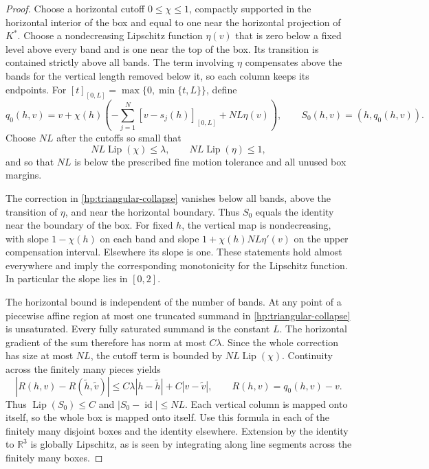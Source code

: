 \documentclass[11pt]{article}
\numberwithin{equation}{section}
\theoremstyle{definition}
\theoremstyle{remark}
\newcommand{\R}{\mathbb R}
\newcommand{\Id}{\operatorname{id}}
\DeclareMathOperator{\Lip}{Lip}
\begin{document}
\begin{proof}
Choose a horizontal cutoff $0\le\chi\le1$, compactly supported in
the horizontal interior of the box and equal to one near the
horizontal projection of $K^*$.  Choose a nondecreasing Lipschitz
function $\eta(v)$ that is zero below a fixed level above every band
and is one near the top of the box.  Its transition is contained
strictly above all bands.  The term involving $\eta$ compensates
above the bands for the vertical length removed below it, so each
column keeps its endpoints.  For
$[t]_{[0,L]}=\max\{0,\min\{t,L\}\}$, define
\begin{equation}\label{hp:triangular-collapse}
 q_0(h,v)=v+\chi(h)\left(
       -\sum_{j=1}^N[v-s_j(h)]_{[0,L]}+NL\eta(v)\right),
 \qquad S_0(h,v)=(h,q_0(h,v)).
\end{equation}
Choose $NL$ after the cutoffs so small that
\begin{equation}\label{hp:band-cutoff-smallness}
 NL\Lip(\chi)\le\lambda,
 \qquad NL\Lip(\eta)\le1,
\end{equation}
and so that $NL$ is below the prescribed fine motion tolerance and
all unused box margins.

The correction in \eqref{hp:triangular-collapse} vanishes below all
bands, above the transition of $\eta$, and near the horizontal
boundary.  Thus $S_0$ equals the identity near the boundary of the
box.  For fixed $h$, the vertical map is nondecreasing, with slope
$1-\chi(h)$ on each band and slope
$1+\chi(h)NL\eta'(v)$ on the upper compensation interval.  Elsewhere
its slope is one.  These statements hold almost everywhere and
imply the corresponding monotonicity for the Lipschitz function.
In particular the slope lies in $[0,2]$.

The horizontal bound is independent of the number of bands.  At any
point of a piecewise affine region at most one truncated summand in
\eqref{hp:triangular-collapse} is unsaturated.  Every fully saturated
summand is the constant $L$.  The horizontal gradient of the sum
therefore has norm at most $C\lambda$.  Since the whole correction
has size at most $NL$, the cutoff term is bounded by
$NL\Lip(\chi)$.  Continuity across the finitely many pieces yields
\begin{equation}\label{hp:anisotropic-correction}
 |R(h,v)-R(\widetilde h,\widetilde v)|
 \le C\lambda|h-\widetilde h|+C|v-\widetilde v|,
 \qquad R(h,v)=q_0(h,v)-v.
\end{equation}
Thus $\Lip(S_0)\le C$ and $|S_0-\Id|\le NL$.  Each vertical
column is mapped onto itself, so the whole box is mapped onto itself.
Use this formula in each of the finitely many disjoint boxes and the
identity elsewhere.  Extension by the identity to $\R^3$ is globally
Lipschitz, as is seen by integrating along line segments across the
finitely many boxes.


\end{proof}
\end{document}
